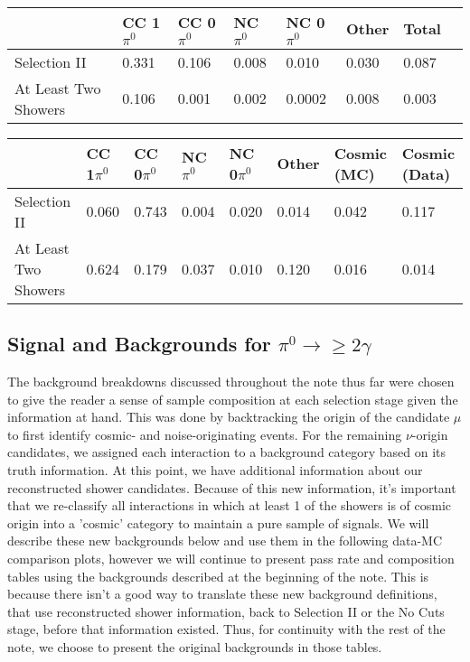 \documentclass{article}
\begin{document}
\begin{table}[H]
\centering
{}
 \begin{tabular}{| l | l | l |l|l|l|l|l|}
 \hline
 & CC 1$\pi^0$ & CC 0$\pi^0$ & NC $\pi^0$ & NC 0$\pi^0$ & Other & Total \\ [0.1ex] \hline
Selection II & 0.331 & 0.106 & 0.008 & 0.010 & 0.030 & 0.087 \\
At Least Two Showers & 0.106 & 0.001 & 0.002 & 0.0002 & 0.008 & 0.003 \\ \hline
\end{tabular}
\end{table}

\begin{table}[H]
\centering
{}
 \begin{tabular}{| l | l | l |l|l|l|l|l|}
 \hline
 & CC 1$\pi^0$ & CC 0$\pi^0$ & NC $\pi^0$ & NC 0$\pi^0$ & Other & Cosmic (MC) & Cosmic (Data) \\ [0.1ex] \hline
Selection II & 0.060 & 0.743 & 0.004 & 0.020 & 0.014 & 0.042 & 0.117 \\
At Least Two Showers & 0.624 & 0.179 & 0.037 & 0.010 & 0.120 & 0.016 & 0.014\\ \hline
\end{tabular}
\end{table}

\subsection{Signal and Backgrounds for $\pi^0\rightarrow\geq 2 \gamma$}
The background breakdowns discussed throughout the note thus far were chosen to give the reader a sense of sample composition at each selection stage given the information at hand. This was done by backtracking the origin of the candidate $\mu$ to first identify cosmic- and noise-originating events. For the remaining $\nu$-origin candidates, we assigned each interaction to a background category based on its truth information. At this point, we have additional information about our reconstructed shower candidates.  Because of this new information, it's important that we re-classify all interactions in which at least 1 of the showers is of cosmic origin into a 'cosmic' category to maintain a pure sample of signals. We will describe these new backgrounds below and use them in the following data-MC comparison plots, however we will continue to present pass rate and composition tables using the backgrounds described at the beginning of the note.  This is because there isn't a good way to translate these new background definitions, that use reconstructed shower information, back to Selection II or the No Cuts stage, before that information existed. Thus, for continuity with the rest of the note, we choose to present the original backgrounds in those tables.  
\end{document}
